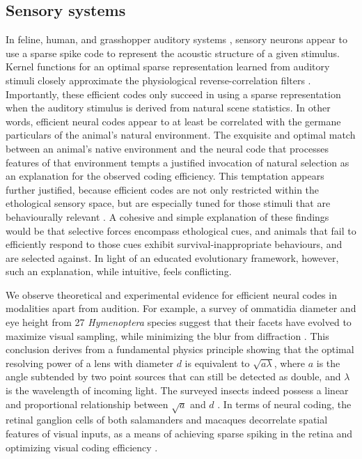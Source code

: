 \documentclass[twocolumn]{article}
\begin{document}
\subsection{Sensory systems}
In feline, human, and grasshopper auditory systems \cite{Machens_Gollisch_Kolesnikova_Herz_2005, smith_lewicki_2006}, sensory neurons appear to use a sparse spike code to represent the acoustic structure of a given stimulus. Kernel functions for an optimal sparse representation learned from auditory stimuli closely approximate the physiological reverse-correlation filters \cite{smith_lewicki_2006}. Importantly, these efficient codes only succeed in using a sparse representation when the auditory stimulus is derived from natural scene statistics. In other words, efficient neural codes appear to at least be correlated with the germane particulars of the animal's natural environment. The exquisite and optimal match between an animal's native environment and the neural code that processes features of that environment tempts a justified invocation of natural selection as an explanation for the observed coding efficiency. This temptation appears further justified, because efficient codes are not only restricted within the ethological sensory space, but are especially tuned for those stimuli that are behaviourally relevant \cite{Machens_Gollisch_Kolesnikova_Herz_2005, machens_herz_2001}. A cohesive and simple explanation of these findings would be that selective forces encompass ethological cues, and animals that fail to efficiently respond to those cues exhibit survival-inappropriate behaviours, and are selected against. In light of an educated evolutionary framework, however, such an explanation, while intuitive, feels conflicting.

We observe theoretical and experimental evidence for efficient neural codes in modalities apart from audition. For example, a survey of ommatidia diameter and eye height from 27 \textit{Hymenoptera} species suggest that their facets have evolved to maximize visual sampling, while minimizing the blur from diffraction \cite{barlow_1952}. This conclusion derives from a fundamental physics principle showing that the optimal resolving power of a lens with diameter $d$ is equivalent to $\sqrt{a \lambda}$, where $a$ is the angle subtended by two point sources that can still be detected as double, and $\lambda$ is the wavelength of incoming light. The surveyed insects indeed possess a linear and proportional relationship between $\sqrt{a}$ and $d$ \cite{barlow_1952}. In terms of neural coding, the retinal ganglion cells of both salamanders and macaques decorrelate spatial features of visual inputs, as a means of achieving sparse spiking in the retina and optimizing visual coding efficiency \cite{Pitkow_Meister_2012}. 
\end{document}
